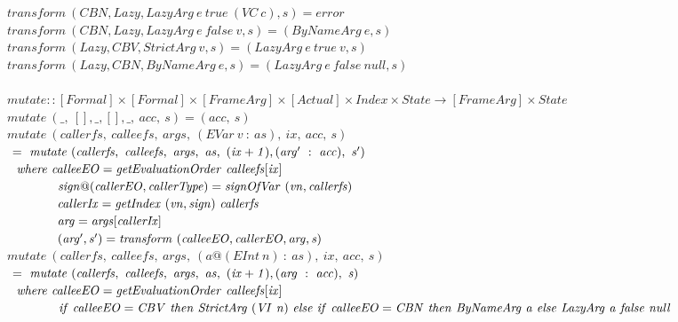\documentclass[diploma]{softlab-thesis}
\begin{document}
\begin{figure}[h]
  $\mathit{transform~(CBN, Lazy, LazyArg~e~true~(VC~c), s) = error}$ \\
  $\mathit{transform~(CBN, Lazy, LazyArg~e~false~v, s) = (ByNameArg~e, s)}$ \\
  $\mathit{transform~(Lazy, CBV, StrictArg~v, s) = (LazyArg~e~true~v, s)}$ \\
  $\mathit{transform~(Lazy, CBN, ByNameArg~e, s) = (LazyArg~e~false~null, s)}$ \\
  \\%
  $\mathit{mutate :: [Formal] \times [Formal] \times [FrameArg]
            \times [Actual] \times Index \times State \rightarrow [FrameArg] \times State} $ \\
  $\mathit{mutate~(\_,~[],\_,[],\_,~acc,~s)=(acc,~s)}$ \\
  $\mathit{mutate~(callerfs,~calleefs,~args,~(EVar~v~:~as),~ix,~acc,~s)}$ \\
  $\mathit{\hfill\ =~mutate~(callerfs,~calleefs,~args,~as,~(ix+1),(arg'~:~acc), ~s')}$ \\
  $\mathit{\hfill\ \hfill\ where~calleeEO=getEvaluationOrder~calleefs[ix]}$ \\
  $\mathit{\hfill\ \hfill\ \hfill\ \hfill\ \hfill\ \hfill\ \hfill\ \hfill\ \hfill\ \hfill\ \hfill\ \hfill\ 
            sign@(callerEO, callerType) = signOfVar~(vn, callerfs)}$ \\
  $\mathit{\hfill\ \hfill\ \hfill\ \hfill\ \hfill\ \hfill\ \hfill\ \hfill\ \hfill\ \hfill\ \hfill\ \hfill\ 
            callerIx = getIndex~(vn, sign)~callerfs}$ \\
  $\mathit{\hfill\ \hfill\ \hfill\ \hfill\ \hfill\ \hfill\ \hfill\ \hfill\ \hfill\ \hfill\ \hfill\ \hfill\ 
            arg = args[callerIx]}$ \\
  $\mathit{\hfill\ \hfill\ \hfill\ \hfill\ \hfill\ \hfill\ \hfill\ \hfill\ \hfill\ \hfill\ \hfill\ \hfill\ 
            (arg', s') = transform~(calleeEO, callerEO, arg, s)}$ \\
  $\mathit{mutate~(callerfs,~calleefs,~args,~(a@(EInt~n)~:~as),~ix,~acc,~s)}$ \\
  $\mathit{\hfill\ =~mutate~(callerfs,~calleefs,~args,~as,~(ix+1),(arg~:~acc), ~s)}$ \\
  $\mathit{\hfill\ \hfill\ where~calleeEO=getEvaluationOrder~calleefs[ix]}$ \\
  $\mathit{\hfill\ \hfill\ \hfill\ \hfill\ \hfill\ \hfill\ \hfill\ \hfill\ \hfill\ \hfill\ \hfill\ \hfill\ 
      if~calleeEO=CBV~then~StrictArg~(VI~n)~else~if~calleeEO=CBN~then~ByNameArg~a~else~LazyArg~a~false~null}$ \\

\end{figure}
\end{document}
